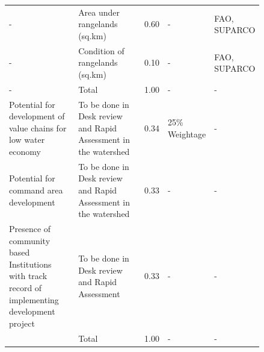 \begin{longtable}{| p{0.3\linewidth} | p{0.3\linewidth} | p{0.07\linewidth} | p{0.07\linewidth} |p{0.1\linewidth} | }
    -                                                                                              & Area under rangelands (sq.km)                                   & 0.60   & -              & FAO, SUPARCO          \\
    -                                                                                              & Condition of rangelands (sq.km)                                 & 0.10   & -              & FAO, SUPARCO          \\
    \hline
    -                                                                                              & Total                                                           & 1.00   & -              & -                     \\
    \hline
    Potential for development of value chains for low water economy                                & To be done in Desk review and Rapid Assessment in the watershed & 0.34   & 25\% Weightage & -                      \\
    Potential for command area development                                                         & To be done in Desk review and Rapid Assessment in the watershed & 0.33   & -              & -                      \\
    Presence of community based Institutions with track record of implementing development project  & To be done in Desk review and Rapid Assessment                 & 0.33   & -              & -                      \\
    \hline
    & Total                                                           & 1.00   & -              & -                     \\
    \hline
\end{longtable}

